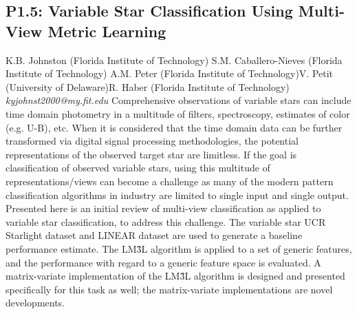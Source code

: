 \documentclass{report}
\begin{document}
\subsection*{P1.5: Variable Star Classification Using Multi-View Metric Learning}
\bigskip
K.B. Johnston (Florida Institute of Technology) \newline S.M. Caballero-Nieves (Florida Institute of Technology) \newline  A.M. Peter (Florida Institute of Technology)\newline  V. Petit (University of Delaware)\newline R. Haber (Florida Institute of Technology)\newline  \newline\newline
{\it kyjohnst2000@my.fit.edu}\newline
\newline\newline
Comprehensive observations of variable stars can include time domain photometry in a multitude of filters, spectroscopy, estimates of color (e.g. U-B), etc. When it is considered that the time domain data can be further transformed via digital signal processing methodologies, the potential representations of the observed target star are limitless. If the goal is classification of observed variable stars, using this multitude of representations/views can become a challenge as many of the modern pattern classification algorithms in industry are limited to single input and single output. Presented here is an initial review of multi-view classification as applied to variable star classification, to address this challenge. The variable star UCR Starlight dataset and LINEAR dataset are used to generate a baseline performance estimate. The LM\^3L algorithm is applied to a set of generic features, and the performance with regard to a generic feature space is evaluated. A matrix-variate implementation of the LM\^3L algorithm is designed and presented specifically for this task as well; the matrix-variate implementations are novel developments.\newline
\newpage
\end{document}
